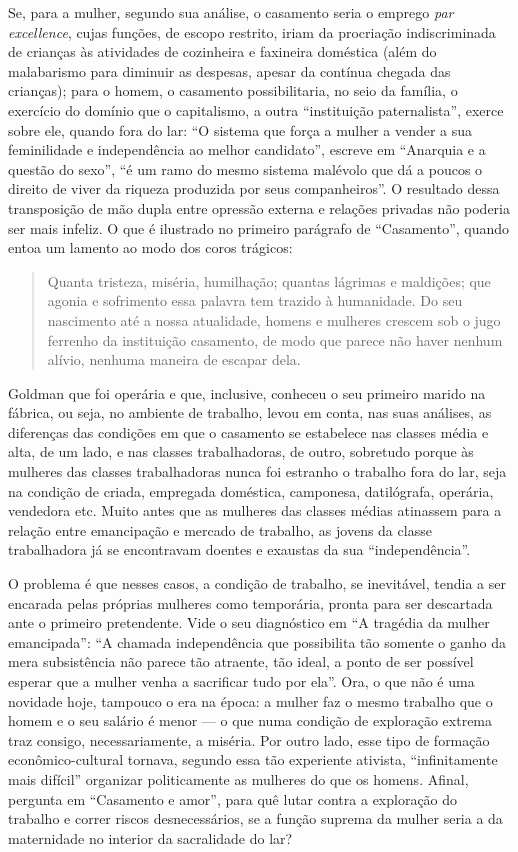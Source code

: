 Se, para a mulher, segundo sua
análise, o casamento seria o emprego \textit{par excellence}, cujas
funções, de escopo restrito, iriam da procriação indiscriminada de
crianças às atividades de cozinheira e faxineira doméstica (além do
malabarismo para diminuir as despesas, apesar da contínua chegada das
crianças); para o homem, o casamento possibilitaria, no seio da família,
o exercício do domínio que o capitalismo, a outra ``instituição
paternalista'', exerce sobre ele, quando fora do lar: ``O sistema que
força a mulher a vender a sua feminilidade e independência ao melhor
candidato'', escreve em ``Anarquia e a questão do sexo'', ``é um ramo do
mesmo sistema malévolo que dá a poucos o direito de viver da riqueza
produzida por seus companheiros''. O resultado dessa transposição de mão
dupla entre opressão externa e relações privadas não poderia ser mais
infeliz. O que é ilustrado no primeiro parágrafo de ``Casamento'',
quando entoa um lamento ao modo dos coros trágicos:

\begin{quote}
Quanta tristeza, miséria, humilhação; quantas lágrimas e maldições; que
agonia e sofrimento essa palavra tem trazido à humanidade. Do seu
nascimento até a nossa atualidade, homens e mulheres crescem sob o jugo
ferrenho da instituição casamento, de modo que parece não haver nenhum
alívio, nenhuma maneira de escapar dela.
\end{quote}

Goldman que foi operária e que, inclusive, conheceu o seu primeiro
marido na fábrica, ou seja, no ambiente de trabalho, levou em conta, nas
suas análises, as diferenças das condições em que o casamento se
estabelece nas classes média e alta, de um lado, e nas classes
trabalhadoras, de outro, sobretudo porque às mulheres das classes
trabalhadoras nunca foi estranho o trabalho fora do lar, seja na
condição de criada, empregada doméstica, camponesa, datilógrafa,
operária, vendedora etc. Muito antes que as mulheres das classes médias
atinassem para a relação entre emancipação e mercado de trabalho, as
jovens da classe trabalhadora já se encontravam doentes e exaustas da
sua ``independência''. 

O problema é que nesses casos, a condição de
trabalho, se inevitável, tendia a ser encarada pelas próprias mulheres
como temporária, pronta para ser descartada ante o primeiro pretendente.
Vide o seu diagnóstico em ``A tragédia da mulher emancipada'': ``A
chamada independência que possibilita tão somente o ganho da mera
subsistência não parece tão atraente, tão ideal, a ponto de ser possível
esperar que a mulher venha a sacrificar tudo por ela''. Ora, o que não é
uma novidade hoje, tampouco o era na época: a mulher faz o mesmo
trabalho que o homem e o seu salário é menor --- o que numa condição de
exploração extrema traz consigo, necessariamente, a miséria. Por outro
lado, esse tipo de formação econômico-cultural tornava, segundo essa tão
experiente ativista, ``infinitamente mais difícil'' organizar
politicamente as mulheres do que os homens. Afinal, pergunta em
``Casamento e amor'', para quê lutar contra a exploração do trabalho e
correr riscos desnecessários, se a função suprema da mulher seria a da
maternidade no interior da sacralidade do lar?

